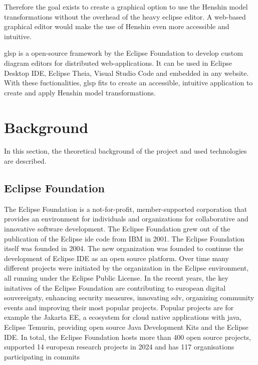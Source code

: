 \documentclass[conference,onecolumn]{IEEEtran}
\begin{document}
  Therefore the goal exists to create a graphical option to use the Henshin model transformations without the overhead of the heavy eclipse editor. A web-based graphical editor would make the use of Henshin even more accessible and intuitive.

  \ac{glsp} is a open-source framework by the Eclipse Foundation to develop custom diagram editors for distributed web-applications. \cite{glsp-repo} It can be used in Eclipse Desktop IDE, Eclipse Theia, Visual Studio Code and embedded in any website. With these fuctionalities, \ac{glsp} fits to create an accessible, intuitive application to create and apply Henshin model transformations.





  \section{Background}
  \label{sec:background}
  In this section, the theoretical background of the project and used technologies are described. 

  \subsection{Eclipse Foundation}
  \label{subsec:eclipse-foundation}
  The Eclipse Foundation is a not-for-profit, member-supported corporation that provides an environment for individuals and organizations for collaborative and innovative software development. \cite{eclipse-review} The Eclipse Foundation grew out of the publication of the Eclipse \ac{ide} code from IBM in 2001. The Eclipse Foundation itself was founded in 2004. The new organization was founded to continue the development of Eclipse IDE as an open source platform. Over time many different projects were initiated by the organization in the Eclipse environment, all running under the Eclipse Public License. \cite{heise-eclipse-foundation,eclipse-review} In the recent years, the key initatives of the Eclipse Foundation are contributing to european digital souvereignty, enhancing security measures, innovating \ac{sdv}, organizing community events and improving their most popular projects. Popular projects are for example the Jakarta EE, a ecosystem for cloud native applications with java, Eclipse Temurin, providing open source Java Development Kits and the Eclipse IDE. \cite{eclipse-report} In total, the Eclipse Foundation hosts more than 400 open source projects, supported 14 european research projects in 2024 and has 117 organisations participating in commits \cite{eclipse-report}
\end{document}
